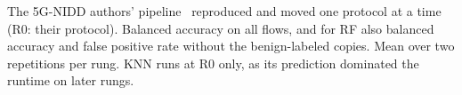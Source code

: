 \begin{table}[t]
\caption{The 5G-NIDD authors' pipeline~\cite{samarakoon2022niddarxiv,siriwardhana2025descriptor} reproduced and moved one protocol at a time (R0: their protocol). Balanced accuracy on all flows, and for RF also balanced accuracy and false positive rate without the benign-labeled copies. Mean over two repetitions per rung. KNN runs at R0 only, as its prediction dominated the runtime on later rungs.}
\label{tab:ladder}
\centering
\footnotesize

\end{table}
